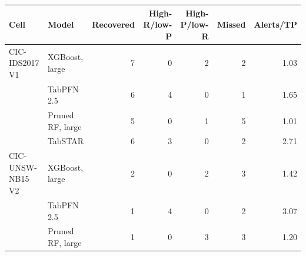 \begin{tabular}{@{}llrrrrr@{}}
\toprule
Cell & Model & Recovered & High-R/low-P & High-P/low-R & Missed & Alerts/TP \\
\midrule
CIC-IDS2017 V1 & XGBoost, large & 7 & 0 & 2 & 2 & 1.03 \\
 & TabPFN 2.5 & 6 & 4 & 0 & 1 & 1.65 \\
 & Pruned RF, large & 5 & 0 & 1 & 5 & 1.01 \\
 & TabSTAR & 6 & 3 & 0 & 2 & 2.71 \\
\addlinespace
CIC-UNSW-NB15 V2 & XGBoost, large & 2 & 0 & 2 & 3 & 1.42 \\
 & TabPFN 2.5 & 1 & 4 & 0 & 2 & 3.07 \\
 & Pruned RF, large & 1 & 0 & 3 & 3 & 1.20 \\
\bottomrule
\end{tabular}
